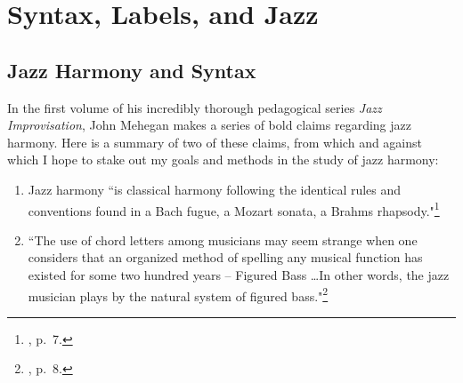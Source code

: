 \chapter{Syntax, Labels, and Jazz}

\section{Jazz Harmony and Syntax}
In the first volume of his incredibly thorough pedagogical series \emph{Jazz Improvisation}, John Mehegan makes a series of bold claims regarding jazz harmony.  Here is a summary of two of these claims, from which and against which I hope to stake out my goals and methods in the study of jazz harmony:
\begin{enumerate}
	\item Jazz harmony ``is classical harmony following the identical rules and conventions found in a Bach fugue, a Mozart sonata, a Brahms rhapsody."\footnote{\cite{mehegan1959}, p.\ 7.}
	\item ``The use of chord letters among musicians may seem strange when one considers that an organized method of spelling any musical function has existed for some two hundred years -- Figured Bass \ldots In other words, the jazz musician plays by the natural system of figured bass."\footnote{\cite{mehegan1959}, p.\ 8.}
\end{enumerate}
